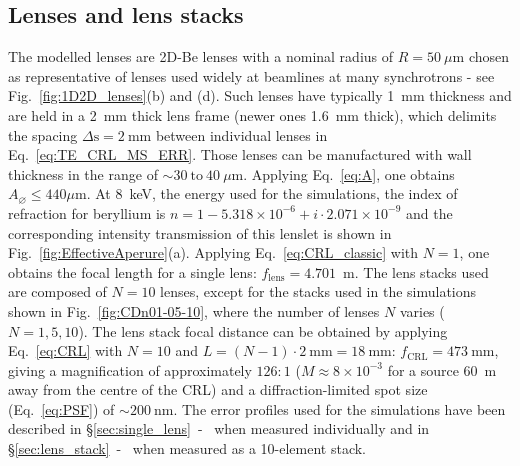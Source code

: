 \begin{refsection}
\section{Lenses and lens stacks}\label{sec:lens_descripiton}
The modelled lenses are 2D-Be lenses with a nominal radius of $R=50~\mu\text{m}$ chosen as representative of lenses used widely at beamlines at many synchrotrons - see Fig.~\ref{fig:1D2D_lenses}(b) and (d). Such lenses have typically 1~mm thickness and are held in a 2~mm thick lens frame (newer ones 1.6~mm thick), which delimits the spacing $\Delta\text{s}=2~$mm between individual lenses in Eq.~\ref{eq:TE_CRL_MS_ERR}. Those lenses can be manufactured with wall thickness in the range of $\sim30~\text{to}~40~\mu\text{m}$. Applying Eq.~\ref{eq:A}, one obtains $A_{\diameter}\le440 \mu\text{m}$. At 8~keV, the energy used for the simulations, the index of refraction for beryllium is $n=1-5.318\times10^{-6}+i\cdot2.071\times10^{-9}$ and the corresponding intensity transmission of this lenslet is shown in Fig.~\ref{fig:EffectiveAperure}(a). Applying Eq.~\ref{eq:CRL_classic} with $N=1$, one obtains the focal length for a single lens: $f_{\text{lens}}=4.701$~m. The lens stacks used are composed of $N=10$ lenses, except for the stacks used in the simulations shown in Fig.~\ref{fig:CDn01-05-10}, where the number of lenses $N$ varies ($N=1,5,10$).  The lens stack focal distance can be obtained by applying Eq.~\ref{eq:CRL} with $N=10$ and $L=(N-1)\cdot2~\text{mm}=18~\text{mm}$: $f_{\text{CRL}}=473~{\text{mm}}$, giving a magnification of approximately $126:1$ ($M\approx8\times10^{-3}$ for a source 60~m away from the centre of the CRL) and a diffraction-limited spot size (Eq.~\ref{eq:PSF}) of $\sim200~\text{nm}$. The error profiles used for the simulations have been described in \S\ref{sec:single_lens}~-~\textit{} when measured individually and in \S\ref{sec:lens_stack}~-~\textit{} when measured as a 10-element stack.


\end{refsection}
